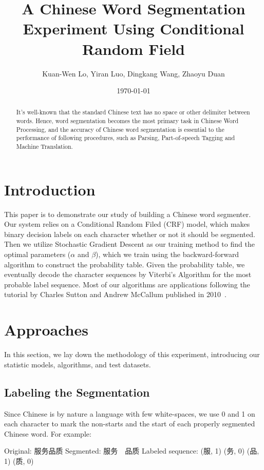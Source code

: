 \documentclass[UTF8,11pt]{article}
\title {\vspace*{-2em}A Chinese Word Segmentation Experiment Using Conditional Random Field}
\author{Kuan-Wen Lo, Yiran Luo, Dingkang Wang, Zhaoyu Duan}
\date {\today}
\begin{document}

\maketitle

\begin{abstract}
\noindent It's well-known that the standard Chinese text has no space or other delimiter between words. Hence, word segmentation becomes the most primary task in Chinese Word Processing, and the accuracy of Chinese word segmentation is essential to the performance of following procedures, such as Parsing, Part-of-speech Tagging and Machine Translation.
\end{abstract}

\section{Introduction}
\noindent This paper is to demonstrate our study of building a Chinese word segmenter. Our system relies on a Conditional Random Filed (CRF) model, which makes binary decision labels on each character whether or not it should be segmented. Then we utilize Stochastic Gradient Descent as our training method to find the optimal parameters ($\alpha$ and $\beta$), which we train using the backward-forward algorithm to construct the probability table. Given the probability table, we eventually decode the character sequences by Viterbi's Algorithm for the most probable label sequence. Most of our algorithms are applications following the tutorial by Charles Sutton and Andrew McCallum published in 2010~\cite{basicmethod}.

\section{Approaches}
\noindent In this section, we lay down the methodology of this experiment, introducing our statistic models, algorithms, and test datasets.
\subsection{Labeling the Segmentation}
\noindent Since Chinese is by nature a language with few white-spaces, we use 0 and 1 on each character to mark the non-starts and the start of each properly segmented Chinese word. For example: \newline

\begin{CJK*}{UTF8}{gbsn}
Original: 服务品质 \newline
\indent Segmented: 服务\ \ 品质 \newline
\indent Labeled sequence: (服, 1) (务, 0) (品, 1) (质, 0)
\end{CJK*}
\end{document}
